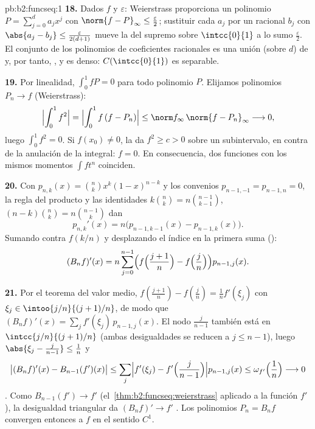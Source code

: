 \begin{solution}{pb:b2:funcseq:1}
\textbf{18.} Dados $f$ y $\varepsilon$: Weierstrass proporciona un
polinomio $P = \sum_{j=0}^d a_jx^j$ con $\norm{f - P}_\infty \leq
\frac\varepsilon2$; sustituir cada $a_j$ por un racional $b_j$ con
$\abs{a_j - b_j} \leq \frac{\varepsilon}{2(d+1)}$ mueve la  del
supremo sobre $\intcc{0}{1}$ a lo sumo $\frac\varepsilon2$. El
conjunto de los polinomios de coeficientes racionales es una unión
 (sobre $d$) de  y, por tanto,
, y es denso: $C(\intcc{0}{1})$ es separable.

\textbf{19.} Por linealidad, $\int_0^1 fP = 0$ para todo polinomio
$P$. Elijamos polinomios $P_n \to f$ 
(Weierstrass):
\[
\Bigl|\int_0^1 f^2\Bigr|
= \Bigl|\int_0^1 f\,(f - P_n)\Bigr|
\leq \norm f_\infty\,\norm{f - P_n}_\infty
\longrightarrow 0 ,
\]
luego $\int_0^1 f^2 = 0$. Si $f(x_0) \neq 0$, la  da $f^2
\geq c > 0$ sobre un subintervalo, en contra de la anulación de la
integral: $f = 0$. En consecuencia, dos funciones  con los
mismos momentos $\int f t^n$ coinciden.

\textbf{20.} Con $p_{n,k}(x) = \binom nk x^k(1-x)^{n-k}$ y los
convenios $p_{n-1,-1} = p_{n-1,n} = 0$, la regla del producto y las
identidades $k\binom nk = n\binom{n-1}{k-1}$, $(n-k)\binom nk =
n\binom{n-1}{k}$ dan
\[
p_{n,k}'(x) = n\bigl(p_{n-1,k-1}(x) - p_{n-1,k}(x)\bigr) .
\]
Sumando contra $f(k/n)$ y desplazando el índice en la primera suma
():
\[
(B_nf)'(x) = n\sum_{j=0}^{n-1}\Bigl(f\Bigl(\frac{j+1}n\Bigr)
- f\Bigl(\frac jn\Bigr)\Bigr)p_{n-1,j}(x) .
\]

\textbf{21.} Por el teorema del valor medio, $f(\frac{j+1}n) -
f(\frac jn) = \frac1n f'(\xi_j)$ con $\xi_j \in
\intoo{j/n}{(j+1)/n}$, de modo que $(B_nf)'(x) = \sum_j
f'(\xi_j)\,p_{n-1,j}(x)$. El nodo $\frac{j}{n-1}$ también está en
$\intcc{j/n}{(j+1)/n}$ (ambas desigualdades se reducen a $j \leq
n-1$), luego $\abs{\xi_j - \frac j{n-1}} \leq \frac1n$ y
\[
\bigl|(B_nf)'(x) - B_{n-1}(f')(x)\bigr|
\leq \sum_j\Bigl|f'(\xi_j) -
f'\Bigl(\frac{j}{n-1}\Bigr)\Bigr| p_{n-1,j}(x)
\leq \omega_{f'}\Bigl(\frac1n\Bigr) \longrightarrow 0
\]
. Como $B_{n-1}(f') \to f'$  (el~\cref{thm:b2:funcseq:weierstrass} aplicado a la función 
$f'$), la desigualdad triangular da $(B_nf)' \to f'$
. Los polinomios $P_n = B_nf$ convergen entonces a $f$
en el sentido $C^1$.


\end{solution}
